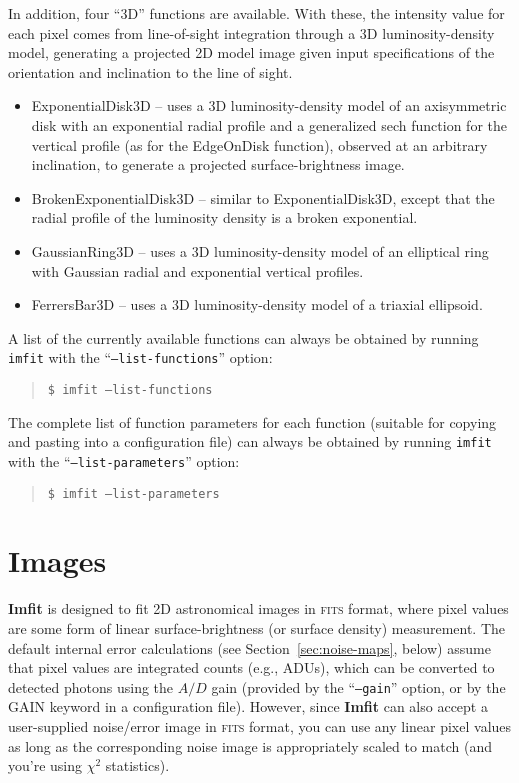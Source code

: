 \documentclass[10pt,a4paper,article]{memoir}
\newcommand{\imfit}{\textbf{Imfit}}
\newcommand{\Imfit}{\textbf{Imfit}}
\newcommand{\imfitprog}{\texttt{imfit}}
\newcommand{\chisquare}{\ensuremath{\chi^{2}}}
\begin{document}
In addition, four ``3D'' functions are available. With these, the
intensity value for each pixel comes from line-of-sight integration
through a 3D luminosity-density model, generating a projected 2D model
image given input specifications of the orientation and inclination to
the line of sight.
\begin{itemize}

\item ExponentialDisk3D -- uses a 3D luminosity-density model of an
axisymmetric disk with an exponential radial profile and a
generalized sech function for the vertical profile (as for the EdgeOnDisk
function), observed at an arbitrary inclination, to generate a projected
surface-brightness image.

\item BrokenExponentialDisk3D -- similar to ExponentialDisk3D, except that the
radial profile of the luminosity density is a broken exponential.

\item GaussianRing3D -- uses a 3D luminosity-density model of an
elliptical ring with Gaussian radial and exponential vertical profiles.

\item FerrersBar3D -- uses a 3D luminosity-density model of a triaxial
\citet{ferrers} ellipsoid.

\end{itemize}

A list of the currently available functions can always be obtained
by running \imfitprog{} with the ``\texttt{--list-functions}'' option:
\begin{quote}
  \texttt{\$ \imfitprog{} --list-functions}
\end{quote}
The complete list of function parameters for each function (suitable for copying
and pasting into a configuration file) can always be
obtained by running \imfitprog{} with the ``\texttt{--list-parameters}'' option:
\begin{quote}
  \texttt{\$ \imfitprog{} --list-parameters}
\end{quote}




\newpage

\chapter{Images}

\Imfit{} is designed to fit 2D astronomical images in \textsc{fits}
format, where pixel values are some form of linear surface-brightness
(or surface density) measurement. The default internal error
calculations (see Section~\ref{sec:noise-maps}, below) assume that pixel
values are integrated counts (e.g., ADUs), which can be converted to
detected photons using the $A/D$ gain (provided by the 
``\texttt{--gain}'' option, or by the GAIN keyword in a configuration
file). However, since \imfit{} can also accept a user-supplied
noise/error image in \textsc{fits} format, you can use any linear pixel
values as long as the corresponding noise image is appropriately scaled
to match (and you're using \chisquare{} statistics).
\end{document}
